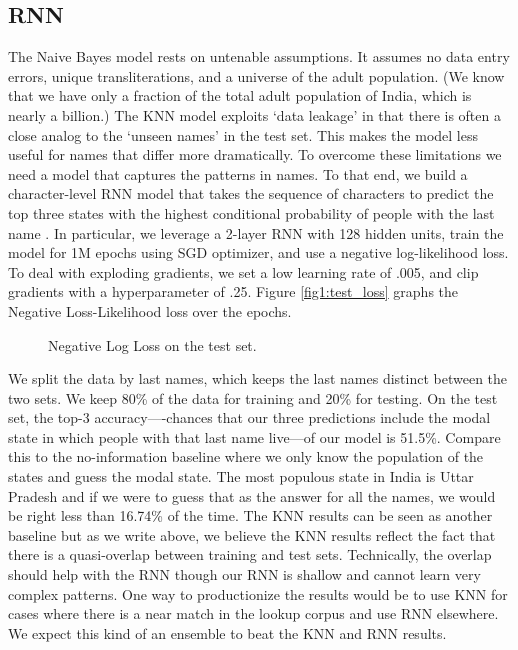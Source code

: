 \documentclass[11pt,  letterpaper]{article}
\begin{document}
\subsection{RNN}

The Naive Bayes model rests on untenable assumptions. It assumes no data entry errors, unique transliterations, and a universe of the adult population. (We know that we have only a fraction of the total adult population of India, which is nearly a billion.) The KNN model exploits `data leakage' in that there is often a close analog to the `unseen names' in the test set. This makes the model less useful for names that differ more dramatically. To overcome these limitations we need a model that captures the patterns in names. To that end, we build a character-level RNN model that takes the sequence of characters to predict the top three states with the highest conditional probability of people with the last name \citep{10.1145/3426826.3426842, 8469258}. In particular, we leverage a 2-layer RNN with 128 hidden units, train the model for 1M epochs using SGD optimizer, and use a negative log-likelihood loss. To deal with exploding gradients, we set a low learning rate of .005, and clip gradients with a hyperparameter of .25. Figure \ref{fig1:test_loss} graphs the Negative Loss-Likelihood loss over the epochs.

\begin{figure}[b]
\label{fig1:test_loss}
  \centering
  \caption{Negative Log Loss on the test set.}
  \label{fig:rf_het_TE}
\end{figure}

We split the data by last names, which keeps the last names distinct between the two sets. We keep 80\% of the data for training and 20\% for testing. On the test set, the top-3 accuracy—-chances that our three predictions include the modal state in which people with that last name live—of our model is 51.5\%. Compare this to the no-information baseline where we only know the population of the states and guess the modal state. The most populous state in India is Uttar Pradesh and if we were to guess that as the answer for all the names, we would be right less than 16.74\% of the time. The KNN results can be seen as another baseline but as we write above, we believe the KNN results reflect the fact that there is a quasi-overlap between training and test sets. Technically, the overlap should help with the RNN though our RNN is shallow and cannot learn very complex patterns. One way to productionize the results would be to use KNN for cases where there is a near match in the lookup corpus and use RNN elsewhere. We expect this kind of an ensemble to beat the KNN and RNN results.
\end{document}
